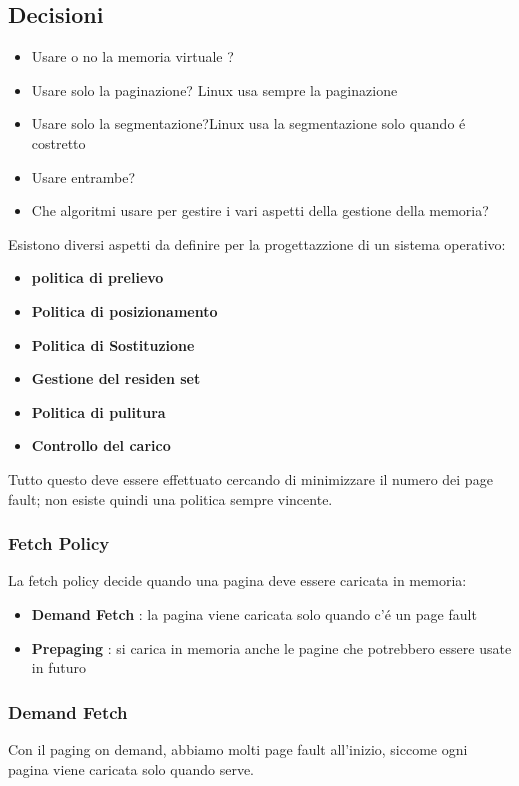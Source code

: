     \subsection{Decisioni}
    \begin{itemize}
        \item Usare o no la memoria virtuale ?
        \item Usare solo la paginazione? Linux usa sempre la paginazione
        \item Usare solo la segmentazione?Linux usa la segmentazione solo quando é costretto
        \item Usare entrambe?
        \item Che algoritmi usare per gestire i vari aspetti della gestione della memoria?
    \end{itemize}
    Esistono diversi aspetti da definire per la progettazzione di un sistema operativo:
    \begin{itemize}
        \item \textbf{politica di prelievo}
        \item \textbf{Politica di posizionamento}
        \item \textbf{Politica di Sostituzione}
        \item \textbf{Gestione del residen set}
        \item \textbf{Politica di pulitura}
        \item \textbf{Controllo del carico}
    \end{itemize}
    Tutto questo deve essere effettuato cercando di minimizzare il numero dei page fault; non esiste quindi una politica
    sempre vincente.
    \subsubsection{Fetch Policy}
    La fetch policy decide quando una pagina deve essere caricata in memoria:
    \begin{itemize}
        \item \textbf{Demand Fetch} : la pagina viene caricata solo quando c'é un page fault
        \item \textbf{Prepaging} : si carica in memoria anche le pagine che potrebbero essere usate in futuro
    \end{itemize}
    \subsubsection*{Demand Fetch}
    Con il paging on demand, abbiamo molti page fault all'inizio, siccome ogni pagina viene caricata solo quando serve.
